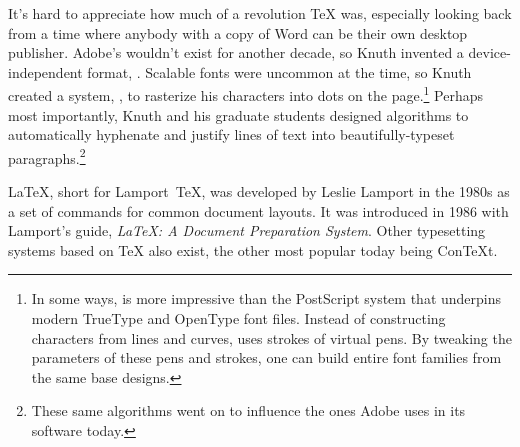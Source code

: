 It's hard to appreciate how much of a revolution \TeX{} was,
especially looking back from a time where anybody with a copy
of Word can be their own desktop publisher.
Adobe's  wouldn't exist for another decade, so Knuth
invented a device-independent format, .
Scalable fonts were uncommon at the time, so Knuth created a system,
\MF, to rasterize his characters into dots on the
page.\punckern\footnote{In some ways,
\MF{} is more impressive than the PostScript system that
underpins modern TrueType and OpenType font files.
Instead of constructing characters from lines and curves,
\MF{} uses strokes of virtual pens.
By tweaking the parameters of these pens and strokes, one can build entire
font families from the same base designs.}
Perhaps most importantly, Knuth and his graduate students designed algorithms
to automatically hyphenate and justify lines of text into
beautifully-typeset paragraphs.\punckern\footnote{These same algorithms went
on to influence the ones Adobe uses in its software today.\punckern{}}

\LaTeX{}, short for Lamport~\TeX{}, was developed by Leslie Lamport in the 1980s
as a set of commands for common document layouts.
It was introduced in 1986 with Lamport's guide,
\textit{\LaTeX: A Document Preparation System}.
Other typesetting systems based on \TeX{} also exist,
the other most popular today being Con\TeX{}t.

